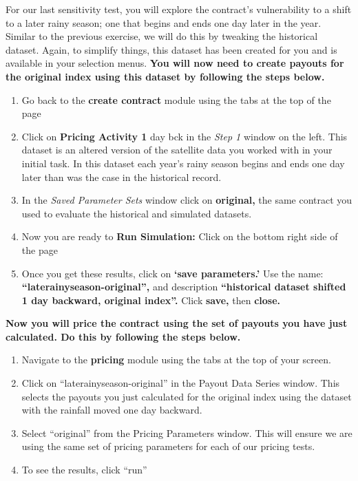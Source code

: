 \documentclass[letterpaper,10pt,english]{sphinxmanual}
\begin{document}
For our last sensitivity test, you will explore the contract's vulnerability to a shift to a later rainy season; one that begins and ends one day later in the year. Similar to the previous exercise, we will do this by tweaking the historical dataset. Again, to simplify things, this dataset has been created for you and is available in your selection menus. \textbf{You will now need to create payouts for the original index using this dataset by following the steps below.}
\begin{enumerate}
\item {} 
Go back to the \textbf{create contract} module using the tabs at the top of the page

\item {} 
Click on \textbf{Pricing Activity 1} day bck in the \emph{Step 1} window on the left.  This dataset is an altered version of the satellite data you worked with in your initial task. In this dataset each year's rainy season begins and ends one day later than was the case in the historical record.

\item {} 
In the \emph{Saved Parameter Sets} window click on \textbf{original,} the same contract you used to evaluate the historical and simulated datasets.

\item {} 
Now you are ready to \textbf{Run Simulation:} Click on the bottom right side of the page

\item {} 
Once you get these results, click on \textbf{`save parameters.'} Use the name: \textbf{``laterainyseason-original'',} and description \textbf{``historical dataset shifted 1 day backward, original index''.} Click \textbf{save,} then \textbf{close.}

\end{enumerate}

\textbf{Now you will price the contract using the set of payouts you have just calculated. Do this by following the steps below.}
\begin{enumerate}
\item {} 
Navigate to the \textbf{pricing} module using the tabs at the top of your screen.

\item {} 
Click on ``laterainyseason-original'' in the Payout Data Series window.  This selects the payouts you just calculated for the original index using the dataset with the rainfall moved one day backward.

\item {} 
Select ``original'' from the Pricing Parameters window.  This will ensure we are using the same set of pricing parameters for each of our pricing tests.

\item {} 
To see the results, click ``run''

\end{enumerate}
\end{document}
